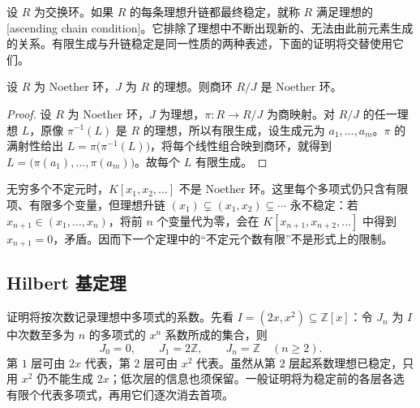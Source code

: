 设 \(R\) 为交换环。如果 \(R\) 的每条理想升链都最终稳定，就称 \(R\) 满足理想的[ascending chain condition]。它排除了理想中不断出现新的、无法由此前元素生成的关系。有限生成与升链稳定是同一性质的两种表述，下面的证明将交替使用它们。

\begin{proposition}\label{b1:prop:noetherian-quotient}
	设 \(R\) 为 Noether 环，\(J\) 为 \(R\) 的理想。则商环 \(R/J\) 是 Noether 环。
\end{proposition}
\begin{proof}
	设 \(R\) 为 Noether 环，\(J\) 为理想，\(\pi:R\rightarrow R/J\) 为商映射。对 \(R/J\) 的任一理想 \(L\)，原像 \(\pi^{-1}(L)\) 是 \(R\) 的理想，所以有限生成，设生成元为 \(a_1,\ldots,a_m\)。\(\pi\) 的满射性给出 \(L=\pi\bigl(\pi^{-1}(L)\bigr)\)，将每个线性组合映到商环，就得到 \(L=\bigl(\pi(a_1),\ldots,\pi(a_m)\bigr)\)。故每个 \(L\) 有限生成。
\end{proof}

无穷多个不定元时，\(K[x_1,x_2,\ldots]\) 不是 Noether 环。这里每个多项式仍只含有限项、有限多个变量，但理想升链 \((x_1)\subsetneq(x_1,x_2)\subsetneq\cdots\) 永不稳定：若 \(x_{n+1}\in(x_1,\ldots,x_n)\)，将前 \(n\) 个变量代为零，会在 \(K[x_{n+1},x_{n+2},\ldots]\) 中得到 \(x_{n+1}=0\)，矛盾。因而下一个定理中的“不定元个数有限”不是形式上的限制。

\subsection{Hilbert 基定理}
\label{b1:subsec:1204:03}

证明将按次数记录理想中多项式的系数。先看 \(I=(2x,x^2)\subseteq\mathbb Z[x]\)：令 \(J_n\) 为 \(I\) 中次数至多为 \(n\) 的多项式的 \(x^n\) 系数所成的集合，则
\[
	J_0=0,\qquad J_1=2\mathbb Z,\qquad J_n=\mathbb Z\quad(n\ge2).
\]
第 \(1\) 层可由 \(2x\) 代表，第 \(2\) 层可由 \(x^2\) 代表。虽然从第 \(2\) 层起系数理想已稳定，只用 \(x^2\) 仍不能生成 \(2x\)；低次层的信息也须保留。一般证明将为稳定前的各层各选有限个代表多项式，再用它们逐次消去首项。

